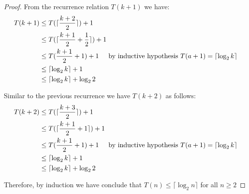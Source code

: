 \documentclass[9pt]{exam}
\begin{document}
\begin{parts}
\begin{customsolutionbox}
\begin{proof}
            From the recurrence relation $T(k+1)$ we have:
            \begin{align*}
                T(k+1) &\leq T(\lceil \frac{k+2}{2}\rceil) + 1 \\
                &\leq T(\lceil \frac{k+1}{2} + \frac{1}{2}\rceil) + 1 \\
                &\leq T(\frac{k+1}{2} + 1) + 1 \hspace{5mm} \text{by inductive hypothesis } T(a+1) = \lceil\log_2k\rceil \\
                &\leq  \lceil\log_2k\rceil +1 \\
                &\leq \lceil\log_2k\rceil + \log_22
            \end{align*}


            Similar to the previous recurrence we have $T(k+2)$ as follows:
            \begin{align*}
                T(k+2) &\leq T(\lceil \frac{k+3}{2}\rceil) + 1 \\
                &\leq T(\lceil \frac{k+1}{2} + 1\rceil) + 1 \\
                &\leq T(\frac{k+1}{2} + 1) + 1 \hspace{5mm} \text{by inductive hypothesis } T(a+1) = \lceil\log_2k\rceil \\
                &\leq  \lceil\log_2k\rceil +1 \\
                &\leq \lceil\log_2k\rceil + \log_22
            \end{align*}

            Therefore, by induction we have conclude that $T(n) \leq \lceil \log_2n \rceil$ for all $ n\geq 2$
        \end{proof}
    \end{customsolutionbox}
\end{parts}
\end{document}
